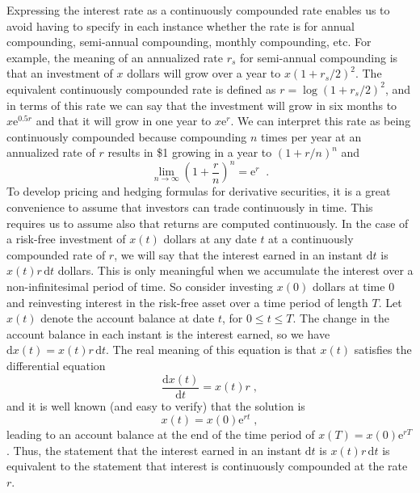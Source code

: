 Expressing the interest rate as a continuously compounded rate enables us to avoid having to specify in each instance whether the rate is for annual compounding, semi-annual compounding, monthly compounding, etc.  For example, the meaning of an annualized rate $r_s$ for semi-annual compounding is that an investment of $x$ dollars will grow over a year to $x(1+r_s/2)^2$.  The equivalent continuously compounded rate is defined as $r = \log (1+r_s/2)^2$, and in terms of this rate we can say that the investment will grow in six months to $x\mathrm{e}^{0.5 r}$ and that it will grow in one year to $x\mathrm{e}^r$.  We can interpret this rate as being continuously compounded because compounding $n$ times per year at an annualized rate of $r$ results in \$1 growing in a year to $(1+r/n)^n$ and
$$\lim_{n \rightarrow \infty} \left(1+\frac{r}{n}\right)^n = \mathrm{e}^r\;\;.$$
To develop pricing and hedging formulas for derivative securities, it is a great convenience to assume that investors can trade continuously in time.  This requires us to assume also that returns are computed continuously.  In the case of a risk-free investment of $x(t)$ dollars at any date $t$ at a continuously compounded rate of $r$, we will say that the interest earned in an instant $\mathrm{d} t$ is $x(t)r\,\mathrm{d} t$ dollars.  This is only meaningful when we accumulate the interest over a non-infinitesimal period of time.  So consider investing $x(0)$ dollars at time 0 and reinvesting interest in the risk-free asset over a time period of length $T$.  Let $x(t)$ denote the account balance at date $t$, for $0\leq t \leq T$.  The change in the account balance in each instant is the interest earned, so we have
$\mathrm{d} x(t) = x(t)r\,\mathrm{d} t$.  The real meaning of this equation is that $x(t)$ satisfies the differential equation
$$\frac{\mathrm{d} x(t)}{\mathrm{d} t} = x(t)r\; ,$$
and it is well known (and easy to verify) that the solution is
$$x(t) = x(0)\mathrm{e}^{rt}\; ,$$
leading to an account balance at the end of the time period of $x(T) = x(0)\mathrm{e}^{rT}$.  Thus, the statement that the interest earned in an instant $\mathrm{d} t$ is $x(t)r\,\mathrm{d} t$ is equivalent to the statement that interest is continuously compounded at the rate $r$.

